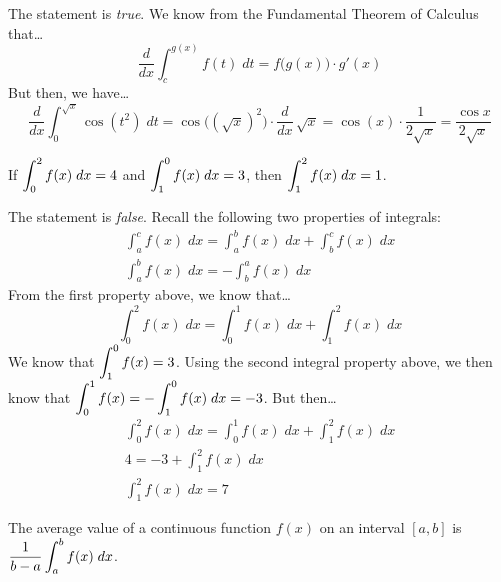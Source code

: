 \documentclass[11pt,letterpaper]{article}
\begin{document}
\sol The statement is \textit{true}. We know from the Fundamental Theorem of Calculus that\dots
	\[
	\dfrac{d}{dx} \int_c^{g(x)} f(t) \;dt= f \big( g(x) \big) \cdot g'(x)
	\]
But then, we have\dots
	\[
	\dfrac{d}{dx} \int_0^{\sqrt{x}} \cos(t^2) \;dt= \cos \big( (\sqrt{x})^2 \big) \cdot \dfrac{d}{dx} \, \sqrt{x}= \cos(x) \cdot \dfrac{1}{2 \sqrt{x}}= \dfrac{\cos x}{2 \sqrt{x}}
	\] \pvspace{1.3cm}



 If $\displaystyle\int_0^2 f(x) \;dx= 4$ and $\displaystyle\int_1^0 f(x) \;dx= 3$, then $\displaystyle\int_1^2 f(x) \;dx= 1$. \pspace

\sol The statement is \textit{false}. Recall the following two properties of integrals:
	\[
	\begin{aligned}
	\int_a^c f(x) \;dx= \int_a^b f(x) \;dx + \int_b^c f(x) \;dx \\
	\int_a^b f(x) \;dx= -\int_b^a f(x) \;dx
	\end{aligned}
	\]
From the first property above, we know that\dots
	\[
	\int_0^2 f(x) \;dx= \int_0^1 f(x) \;dx + \int_1^2 f(x) \;dx
	\]
We know that $\displaystyle\int_1^0 f(x)= 3$. Using the second integral property above, we then know that $\displaystyle\int_0^1 f(x)= - \int_1^0 f(x) \;dx= -3$. But then\dots
	\[
	\begin{gathered}
	\int_0^2 f(x) \;dx= \int_0^1 f(x) \;dx + \int_1^2 f(x) \;dx \\
	4= -3 +  \int_1^2 f(x) \;dx \\ 
	\int_1^2 f(x) \;dx= 7
	\end{gathered}
	\] \pvspace{1.3cm}



 The average value of a continuous function $f(x)$ on an interval $[a, b]$ is $\displaystyle \dfrac{1}{b - a} \int_a^b f(x) \;dx$. \pspace
\end{document}
